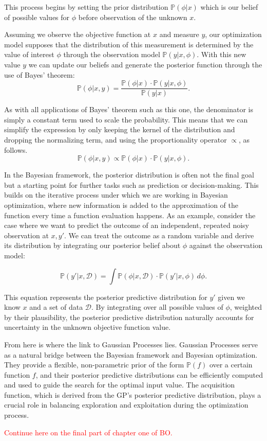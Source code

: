 This process begins by setting the prior distribution $\mathbb{P}(\phi | x)$ which is our belief of possible values for $\phi$ before observation of the unknown $x$. 

Assuming we observe the objective function at $x$ and measure $y$, our optimization model supposes that the distribution of this measurement is determined by the value of interest $\phi$ through the observation model $\mathbb{P}(y | x, \phi)$. With this new value $y$ we can update our beliefs and generate the posterior function through the use of Bayes' theorem: 
\[ \mathbb{P}(\phi | x, y) = \frac{\mathbb{P}(\phi | x) \cdot \mathbb{P}(y | x, \phi)}{\mathbb{P}(y | x)}. \] 

As with all applications of Bayes' theorem such as this one, the denominator is simply a constant term used to scale the probability. This means that we can simplify the expression by only keeping the kernel of the distribution and dropping the normalizing term, and using the proportionality operator $\propto$, as follows. 
\[ \mathbb{P}(\phi | x, y) \propto \mathbb{P}(\phi | x) \cdot \mathbb{P}(y | x, \phi). \] 

In the Bayesian framework, the posterior distribution is often not the final goal but a starting point for further tasks such as prediction or decision-making. This builds on the iterative process under which we are working in Bayesian optimization, where new information is added to the approximation of the function every time a function evaluation happens. As an example, consider the case where we want to predict the outcome of an independent, repeated noisy observation at $x, y'$. We can treat the outcome as a random variable and derive its distribution by integrating our posterior belief about $\phi$ against the observation model:

\[ \mathbb{P}(y' | x, \mathcal{D}) = \int \mathbb{P}(\phi | x, \mathcal{D}) \cdot \mathbb{P}\left(y' | x, \phi\right) \, d \phi. \]

This equation represents the posterior predictive distribution for $y'$ given we know $x$ and a set of data $\mathcal{D}$. By integrating over all possible values of $\phi$, weighted by their plausibility, the posterior predictive distribution naturally accounts for uncertainty in the unknown objective function value.

From here is where the link to Gaussian Processes lies. Gaussian Processes serve as a natural bridge between the Bayesian framework and Bayesian optimization. They provide a flexible, non-parametric prior of the form $\mathbb{P}(f)$ over a certain function $f$, and their posterior predictive distributions can be efficiently computed and used to guide the search for the optimal input value. The acquisition function, which is derived from the GP's posterior predictive distribution, plays a crucial role in balancing exploration and exploitation during the optimization process.

\textcolor{red}{Continue here on the final part of chapter one of BO.}
















